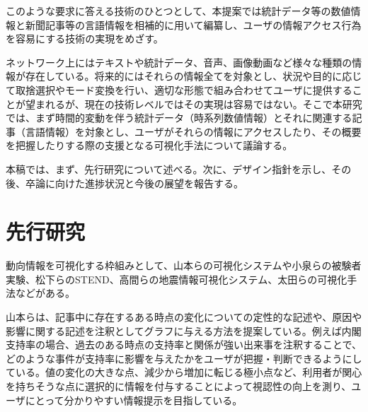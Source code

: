 \documentclass{matsushita-zemi}
\begin{document}
このような要求に答える技術のひとつとして、本提案では統計データ等の数値情報と新聞記事等の言語情報を相補的に用いて編纂し、ユーザの情報アクセス行為を容易にする技術の実現をめざす。

ネットワーク上にはテキストや統計データ、音声、画像動画など様々な種類の情報が存在している。将来的にはそれらの情報全てを対象とし、状況や目的に応じて取捨選択やモード変換を行い、適切な形態で組み合わせてユーザに提供することが望まれるが、現在の技術レベルではその実現は容易ではない。そこで本研究では、まず時間的変動を伴う統計データ（時系列数値情報）とそれに関連する記事（言語情報）を対象とし、ユーザがそれらの情報にアクセスしたり、その概要を把握したりする際の支援となる可視化手法について議論する\cite{Elucignage-jsai}。

本稿では、まず、先行研究について述べる。次に、デザイン指針を示し、その後、卒論に向けた進捗状況と今後の展望を報告する。

\section{先行研究}
\label{relatedworks} 
動向情報を可視化する枠組みとして、山本らの可視化システム\cite{Tagged_corpus}や小泉らの被験者実験\cite{interconversion}、松下らのSTEND\cite{STEND}、高間らの地震情報可視化システム\cite{SpaceTrendInformation}、太田らの可視化手法\cite{numerical_features}などがある。

山本らは、記事中に存在するある時点の変化についての定性的な記述や、原因や影響に関する記述を注釈としてグラフに与える方法を提案している\cite{Tagged_corpus}。例えば内閣支持率の場合、過去のある時点の支持率と関係が強い出来事を注釈することで、どのような事件が支持率に影響を与えたかをユーザが把握・判断できるようにしている。値の変化の大きな点、減少から増加に転じる極小点など、利用者が関心を持ちそうな点に選択的に情報を付与することによって視認性の向上を測り、ユーザにとって分かりやすい情報提示を目指している。
\end{document}

